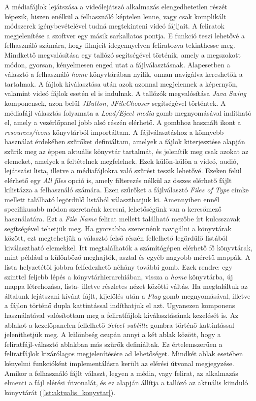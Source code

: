 A médiafájlok lejátszása a videólejátszó alkalmazás elengedhetetlen részét képezik, hiszen enélkül a felhasználó képtelen lenne, vagy csak komplikált módszerek igénybevételével tudná megtekinteni videó fájljait. A feliratok megjelenítése a szoftver egy másik sarkallatos pontja. E funkció teszi lehetővé a felhasználó számára, hogy filmjeit idegennyelven feliratozva tekinthesse meg. Mindkettő megvalósítása egy tallózó segítségével történik, amely a megszokott módon, gyorsan, kényelmesen enged utat a fájlválasztásnak. Alapesetben a választó a felhasználó \textit{home} könyvtárában nyílik, onnan navigálva kereshetők a tartalmak. A fájlok kiválasztása után azok azonnal megjelennek a képernyőn, valamint videó fájlok esetén el is indulnak. A tallózók megvalósítása \textit{Java Swing} komponensek, azon belül \textit{JButton}, \textit{JFileChooser} segítségével történtek. A médiafájl választás folyamata a \textit{Load/Eject media} gomb megnyomásával indítható el, amely a vezérlőpanel jobb alsó részén elérhető. A gombhoz használt ikont a \textit{resources/icons} könyvtárból importáltam. A fájlválasztáshoz a könnyebb használat érdekében szűrőket definiáltam, amelyek a fájlok kiterjesztése alapján szűrik meg az éppen aktuális könyvtár tartalmát, és jelenítik meg csak azokat az elemeket, amelyek a feltételnek megfelelnek. Ezek külön-külön a videó, audió, lejátszási lista, illetve a médiafájlokra való szűrést teszik lehetővé. Ezeken felül elérhető egy \textit{All files} opció is, amely filterezés nélkül az összes elérhető fájlt kilistázza a felhasználó számára. Ezen szűrőket a fájlválasztó \textit{Files of Type} címke mellett található legördülő listából választhatjuk ki. Amennyiben ennél specifikusabb módon szeretnénk keresni, lehetőségünk van a keresőmező használatára. Ezt a \textit{File Name} felirat mellett található mezőbe írt kulcsszavak segítségével tehetjük meg. Ha gyorsabba szeretnénk navigálni a könyvtárak között, ezt megtehetjük a választó felső részén fellelhető legördülő listából kiválasztható elemekkel. Itt megtalálhatók a számítógépen elérhető fő könyvtárak, mint például a különböző meghajtók, asztal és egyéb nagyobb méretű mappák. A lista helyzetétől jobbra felfedezhető néhány további gomb. Ezek rendre: egy szinttel feljebb lépés a könyvtárhierarchiában, vissza a \textit{home} könyvtárba, új mappa létrehozása, lista- illetve részletes nézet közötti váltás. Ha megtaláltuk az általunk lejátszani kívánt fájlt, kijelölés után a \textit{Play} gomb megnyomásával, illetve a fájlon történő dupla kattintással indíthatjuk el azt. Ugyanezen komponens használatával valósítottam meg a feliratfájlok kiválasztásának kezelését is. Az ablakot a kezelőpanelen fellelhető \textit{Select subtitle} gombra történő kattintással jeleníthetjük meg. A különbség csupán annyi a két ablak között, hogy a feliratfájl-választó ablakban más szűrők definiáltak. Ez értelemszerűen a feliratfájlok kizárólagos megjelenítésére ad lehetőséget. Mindkét ablak esetében kényelmi funkcióként implementálásra került az elérési útvonal megjegyzése. Amikor a felhasználó fájlt választ, legyen a média, vagy felirat, az alkalmazás elmenti a fájl elérési útvonalát, és ez alapján állítja a tallózó az aktuális kiinduló könyvtárát (\ref{lst:aktualis_konyvtar}).

